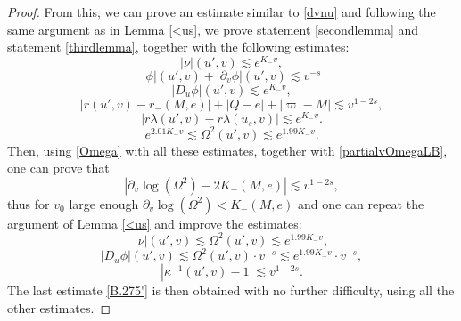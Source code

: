 \documentclass[10pt,a4paper]{article}
\theoremstyle{plain}
\theoremstyle{remark}
\theoremstyle{definition}
\theoremstyle{plain}
\theoremstyle{remark}
\theoremstyle{definition}
\numberwithin{equation}{section}
\begin{document}
\begin{proof}
	From this, we can prove an estimate similar to \eqref{dvnu} and following the same argument as in Lemma \ref{<us}, we prove statement \ref{secondlemma} and statement \ref{thirdlemma}, together with the following estimates:  \begin{equation*} 
	|\nu|(u',v) \lesssim  e^{ K_- v},
	\end{equation*} \begin{equation*} \label{est2}
	| \phi|(u',v)+ | \partial_v \phi|(u',v)  \lesssim  v^{-s}
	\end{equation*} \begin{equation*} 
	|D_u \phi|(u',v) \lesssim  e^{ K_- v},
	\end{equation*} \begin{equation*} \label{est4}
	|r(u',v)-r_-(M,e)|+ |Q-e| + |\varpi-M|  \lesssim  v^{1-2s},
	\end{equation*}  \begin{equation*} \label{est7}
	|r\lambda(u',v)-r\lambda(u_s,v)| \lesssim  e^{K_- v}.
	\end{equation*}
	\begin{equation*} \label{est9}
	e^{2.01 K_- v} \lesssim 	\Omega^2(u',v)\lesssim  e^{1.99 K_- v}.
	\end{equation*}  
	Then, using \eqref{Omega} with all these estimates, together with \eqref{partialvOmegaLB}, one can prove that \begin{equation*}
	|\partial_v \log(\Omega^2)-2K_-(M,e)| \lesssim  v^{1-2s},
	\end{equation*} thus for $v_0$ large enough $\partial_v \log(\Omega^2) <K_-(M,e)$ and one can repeat the argument of Lemma \ref{<us} and improve the estimates:  \begin{equation*} \label{est1}
	|\nu|(u',v) \lesssim \Omega^2(u',v) \lesssim e^{1.99 K_- v },
	\end{equation*}  \begin{equation*} \label{est3}
	|D_u \phi|(u',v) \lesssim  \Omega^2(u',v) \cdot v^{-s} \lesssim e^{1.99 K_-v} \cdot v^{-s}  ,
	\end{equation*} \begin{equation*} \label{est6}
	|\kappa^{-1}(u',v)-1| \lesssim  v^{1-2s}.
	\end{equation*} 
	The last estimate \eqref{B.275'} is then obtained with no further difficulty, using all the other estimates.
	
	
	
	
\end{proof}
\end{document}
